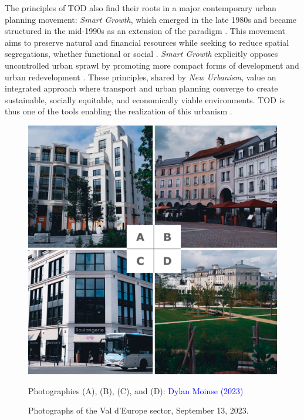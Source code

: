 \begin{refsegment}
The principles of \acrshort{TOD} also find their roots in a major contemporary urban planning movement: \textsl{Smart Growth}, which emerged in the late 1980s and became structured in the mid-1990s as an extension of the  paradigm \textcolor{blue}{\autocites[7]{bentayou_transit-oriented_2015}[71]{liu_analyse_2016}}. This movement aims to preserve natural and financial resources while seeking to reduce spatial segregations, whether functional or social \textcolor{blue}{\autocite[7]{bentayou_transit-oriented_2015}}. \textsl{Smart Growth} explicitly opposes uncontrolled urban sprawl by promoting more compact forms of development and urban redevelopment \textcolor{blue}{\autocites[176]{ouellet_smart_2006}{smart_growth_network_what_2015}}. These principles, shared by \textsl{New Urbanism}, value an integrated approach where transport and urban planning converge to create sustainable, socially equitable, and economically viable environments. \acrshort{TOD} is thus one of the tools enabling the realization of this   urbanism \textcolor{blue}{\autocite[7]{bentayou_transit-oriented_2015}}.%

\begin{figure}[h!]\vspace*{4pt}
    \caption{Photographs of the Val d'Europe sector, September 13, 2023.}
    \label{fig-chap1:photographies-val-europe}
    \centerline{\includegraphics[width=0.75\columnwidth]{src/Figures/Chap-1/Val_Europe.jpg}}
    \vspace{5pt}
    \begin{flushright}\scriptsize{
    Photographies (A), (B), (C), and (D): \textcolor{blue}{Dylan Moinse (2023)}
  }\end{flushright}
\end{figure}


\end{refsegment}
